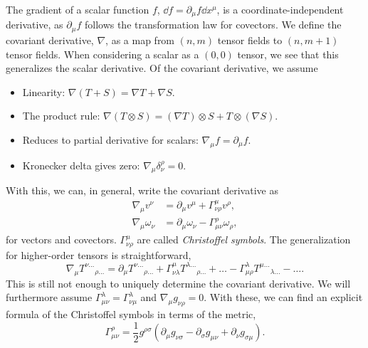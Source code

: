 The gradient of a scalar function $f$, $\dd f = \partial_\mu f \dd x^\mu$, is a coordinate-independent derivative, as $\partial_\mu f$ follows the transformation law for covectors.
We define the covariant derivative, $\nabla$, as a map from $(n, m)$ tensor fields to $(n, m+1)$ tensor fields.
When considering a scalar as a $(0, 0)$ tensor, we see that this generalizes the scalar derivative.
Of the covariant derivative, we assume
%
\begin{itemize}
    \item Linearity: $\nabla (T + S) = \nabla T + \nabla S$.
    \item The product rule: $\nabla (T \otimes S) = (\nabla T)\otimes S + T \otimes (\nabla S)$.
    \item Reduces to partial derivative for scalars: $\nabla_\mu f = \partial_\mu f$.
    \item Kronecker delta gives zero: $\nabla_\mu \delta^\rho_\nu = 0$.
\end{itemize}
%
With this, we can, in general, write the covariant derivative as~\autocite{carrollSpacetimeGeometryIntroduction2019}
%
\begin{align}
    \nabla_\mu v^\nu &= \partial_\mu v^\mu + \Gamma^\mu_{\nu \rho} v^\rho, \\
    \nabla_\mu \omega_\nu &= \partial_\mu \omega_\nu - \Gamma^\rho_{\mu \nu} \omega_\rho,
\end{align}
%
for vectors and covectors.
$\Gamma^{\mu}_{\nu \rho}$ are called \emph{Christoffel symbols}.
The generalization for higher-order tensors is straightforward, 
%
\begin{equation}
    \nabla_\mu T^{\nu\dots}{}_{\rho\dots}
    =
    \partial_\mu T^{\nu\dots}{}_{\rho\dots}
    + \Gamma^\mu_{\nu \lambda} T^{\lambda\dots}{}_{\rho\dots} +\dots
    - \Gamma^\lambda_{\mu \rho} T^{\mu\dots}{}_{\lambda\dots} -\dots.
\end{equation}
%
This is still not enough to uniquely determine the covariant derivative.
We will furthermore assume $\Gamma^{\lambda}_{\mu \nu} = \Gamma^{\lambda}_{\nu \mu}$ and $\nabla_\mu g_{\nu \rho} = 0$.
With these, we can find an explicit formula of the Christoffel symbols in terms of the metric,
%
\begin{equation}
    \label{christoffel symbols from metric}
    \Gamma^\rho_{\mu \nu} = \frac{1}{2} g^{\rho \sigma} (\partial_\mu g_{\nu \sigma} - \partial_\sigma g_{\mu \nu} + \partial_{\nu}g_{\sigma \mu}).
\end{equation}
%

